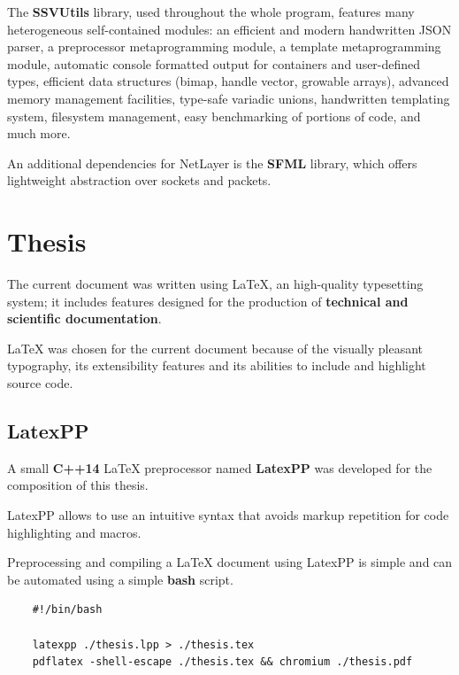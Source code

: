 \documentclass[12pt]{report}
\newcommand{\+}{\discretionary{\mbox{\scriptsize$\hookleftarrow$}}{}{}}
\renewcommand\emph{\textbf}
\begin{document}
                The \emph{SSVUtils} library, used throughout the whole program, features many heterogeneous self-contained modules: an efficient and modern handwritten JSON parser, a preprocessor metaprogramming module, a template metaprogramming module, automatic console formatted output for containers and user-defined types, efficient data structures (bimap, handle vector, growable arrays), advanced memory management facilities, type-safe variadic unions, handwritten templating system, filesystem management, easy benchmarking of portions of code, and much more.

                An additional dependencies for NetLayer is the \emph{SFML} library, which offers lightweight abstraction over sockets and packets.

            \section{Thesis}
                The current document was written using \LaTeX{}, an high-quality typesetting system; it includes features designed for the production of \emph{technical and scientific documentation}.

                \LaTeX{} was chosen for the current document because of the visually pleasant typography, its extensibility features and its abilities to include and highlight source code.

                \subsection{LatexPP}
                    A small \emph{C++14} \LaTeX{} preprocessor named \emph{LatexPP} was developed for the composition of this thesis.

                    LatexPP allows to use an intuitive syntax that avoids markup repetition for code highlighting and macros.

                    Preprocessing and compiling a \LaTeX{} document using LatexPP is simple and can be automated using a simple \emph{bash} script.


\begin{verbatim}
    #!/bin/bash

    latexpp ./thesis.lpp > ./thesis.tex
    pdflatex -shell-escape ./thesis.tex && chromium ./thesis.pdf
\end{verbatim}
\end{document}
